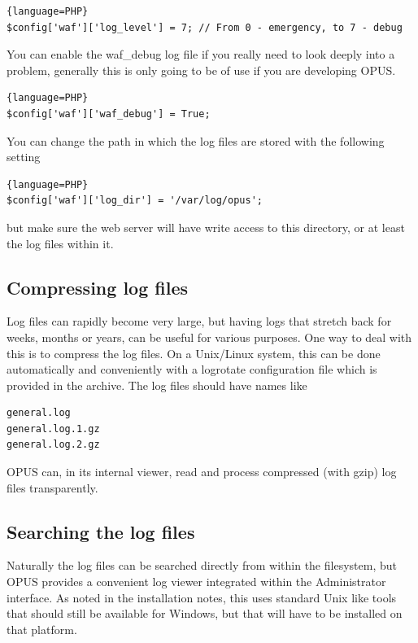 \documentclass[12 pt]{book}
\begin{document}
\begin{lstlisting}{language=PHP}
$config['waf']['log_level'] = 7; // From 0 - emergency, to 7 - debug
\end{lstlisting}

You can enable the waf\_debug log file if you really need to look deeply into a problem, generally this is only going
to be of use if you are developing OPUS.

\begin{lstlisting}{language=PHP}
$config['waf']['waf_debug'] = True;
\end{lstlisting}

You can change the path in which the log files are stored with the following setting

\begin{lstlisting}{language=PHP}
$config['waf']['log_dir'] = '/var/log/opus';
\end{lstlisting}

but make sure the web server will have write access to this directory, or at least the log files within it.


\subsection{Compressing log files}

Log files can rapidly become very large, but having logs that stretch back for weeks, months or years, can
be useful for various purposes. One way to deal with this is to compress the log files. On a Unix/Linux
system, this can be done automatically and conveniently with a logrotate configuration file which is
provided in the archive. The log files should have names like

\begin{lstlisting}
general.log
general.log.1.gz
general.log.2.gz
\end{lstlisting}

OPUS can, in its internal viewer, read and process compressed (with gzip) log files transparently.


\subsection{Searching the log files}

Naturally the log files can be searched directly from within the filesystem, but OPUS provides a
convenient log viewer integrated within the Administrator interface. As noted in the installation notes,
this uses standard Unix like tools that should still be available for Windows, but that will have to
be installed on that platform.
\end{document}
